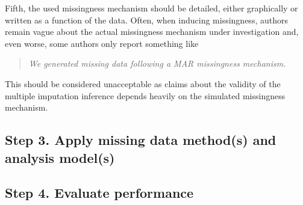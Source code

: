 \documentclass[bimj,fleqn]{w-art}
\theoremstyle{plain}
\theoremstyle{definition}
\begin{document}
Fifth, the used missingness mechanism should be detailed, either graphically or written as a function of the data. Often, when inducing missingness, authors remain vague about the actual missingness mechanism under investigation and, even worse, some authors only report something like
\begin{quote}
\emph{We generated missing data following a MAR missingness mechanism.}
\end{quote}
This should be considered unacceptable as claims about the validity of the multiple imputation inference depends heavily on the simulated missingness mechanism. 


\subsection{Step 3. Apply missing data method(s) and analysis model(s)}



\subsection{Step 4. Evaluate performance}

\end{document}
